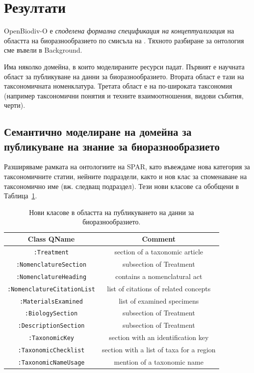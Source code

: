 \section{Резултати}

OpenBiodiv-O е \emph{споделена формална спецификация на концептуализация} на областта на биоразнообразието по смисъла на \cite{gruber_translation_1993, obitko_translations_2007, staab_handbook_2009}. Тяхното разбиране за онтология сме въвели в Background. 

Има няколко домейна, в които моделираните ресурси падат. Първият е научната област за публикуване на данни за биоразнообразието. Втората област е тази на таксономичната номенклатура. Третата област е на по-широката таксономия (например таксономични понятия и техните взаимоотношения, видови събития, черти).

\subsection{Семантично моделиране на домейна за публикуване на знание за биоразнообразието}

Разширяваме рамката на онтологиите на SPAR, като въвеждаме нова категория за таксономичните статии, нейните подраздели, както и нов клас за споменаване на таксономично име (вж. следващ подраздел). Тези нови класове са обобщени в Таблица~\ref{bibliographic_classes}.

\begin{table}[h!]
\caption{Нови класове в областта на публикуването на данни за биоразнообразието.}
      \begin{tabular}{cc}
        \hline
          Class QName             & Comment\\  \hline
  {\tt :Treatment}                & section of a taxonomic article\\
  {\tt :NomenclatureSection}      & subsection of Treatment\\
  {\tt :NomenclatureHeading}      & contains a nomenclatural act \\
  {\tt :NomenclatureCitationList} & list of citations of related concepts\\
  {\tt :MaterialsExamined}        & list of examined specimens\\
  {\tt :BiologySection}           & subsection of Treatment\\
  {\tt :DescriptionSection}       & subsection of Treatment\\
  {\tt :TaxonomicKey}             & section with an identification key\\
  {\tt :TaxonomicChecklist}       & section with a list of taxa for a region\\ 
  {\tt :TaxonomicNameUsage}       & mention of a taxonomic name\\ \hline

      \end{tabular}
      \label{bibliographic_classes}
\end{table}

